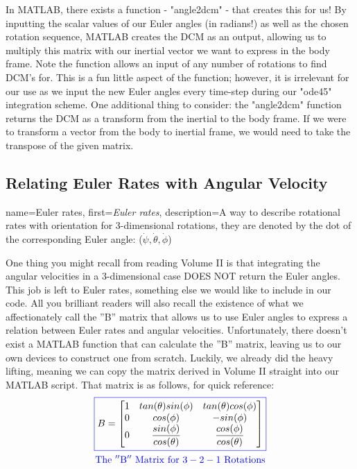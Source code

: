 \documentclass[12pt]{report}
\begin{document}
In MATLAB, there exists a function - "angle2dcm" - that creates this for us! By inputting the scalar values of our \gls{Euler angles} (in radians!) as well as the chosen rotation sequence, MATLAB creates the DCM as an output, allowing us to multiply this matrix with our inertial vector we want to express in the \gls{body frame}. Note the function allows an input of any number of rotations to find DCM's for. This is a fun little aspect of the function; however, it is irrelevant for our use as we input the new \gls{Euler angles} every time-step during our "ode45" integration scheme. One additional thing to consider: the "angle2dcm" function returns the DCM as a transform from the inertial to the \gls{body frame}. If we were to transform a vector from the body to \gls{inertial frame}, we would need to take the transpose of the given matrix.

\subsection{Relating Euler Rates with Angular Velocity}

{
    name=Euler rates,
    first={\textit{Euler rates}},
    description={A way to describe rotational rates with orientation for 3-dimensional rotations, they are denoted by the dot of the corresponding Euler angle: ($\dot{\psi},\dot{\theta},\dot{\phi}$)}
}

One thing you might recall from reading Volume II is that integrating the angular velocities in a 3-dimensional case DOES NOT return the \gls{Euler angles}. This job is left to \gls{Euler rates}, something else we would like to include in our code. All you brilliant readers will also recall the existence of what we affectionately call the ''B'' matrix that allows us to use \gls{Euler angles} to express a relation between \gls{Euler rates} and angular velocities. Unfortunately, there doesn't exist a MATLAB function that can calculate the ''B'' matrix, leaving us to our own devices to construct one from scratch. Luckily, we already did the heavy lifting, meaning we can copy the matrix derived in Volume II straight into our MATLAB script. That matrix is as follows, for quick reference:
\begin{gather}
    \color{blue}\boxed{\color{black}B=\begin{bmatrix}
    1&tan(\theta)sin(\phi)&tan(\theta)cos(\phi)\\
    0&cos(\phi)&-sin(\phi)\\
    0&\dfrac{sin(\phi)}{cos(\theta)}&\dfrac{cos(\phi)}{cos(\theta)}
\end{bmatrix}}\\\color{blue}\mathrm{The\ ''B''\ Matrix\ for\ 3-2-1\ Rotations}
\end{gather}
\end{document}
